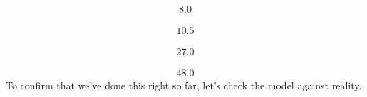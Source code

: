 \documentclass[letterpaper,10pt,english]{sphinxmanual}
\begin{document}
\begin{equation*}
\begin{split}\displaystyle 8.0\end{split}
\end{equation*}
\begin{sphinxVerbatim}[commandchars=\\\{\}]
  
\end{sphinxVerbatim}
\begin{equation*}
\begin{split}\displaystyle 10.5\end{split}
\end{equation*}
\begin{sphinxVerbatim}[commandchars=\\\{\}]
  \PYG{p}{[}\PYG{p}{]}
\end{sphinxVerbatim}
\begin{equation*}
\begin{split}\displaystyle 27.0\end{split}
\end{equation*}
\begin{sphinxVerbatim}[commandchars=\\\{\}]
  \PYG{p}{[}\PYG{p}{]}
\end{sphinxVerbatim}
\begin{equation*}
\begin{split}\displaystyle 48.0\end{split}
\end{equation*}
\sphinxAtStartPar
To confirm that we’ve done this right so far, let’s check the model against reality.
\end{document}
